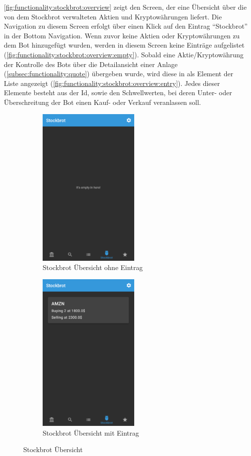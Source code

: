 \documentclass[a4paper]{article}
\begin{document}
\autoref{fig:functionality:stockbrot:overview} zeigt den Screen, der eine Übersicht über die von dem Stockbrot verwalteten Aktien und Kryptowährungen liefert. Die Navigation zu diesem Screen erfolgt über einen Klick auf den Eintrag "`Stockbrot"' in der Bottom Navigation. Wenn zuvor keine Aktien oder Kryptowährungen zu dem Bot hinzugefügt wurden, werden in diesem Screen keine Einträge aufgelistet (\autoref{fig:functionality:stockbrot:overview:empty}). Sobald eine Aktie/Kryptowährung der Kontrolle des Bots über die Detailansicht einer Anlage (\autoref{subsec:functionality:quote}) übergeben wurde, wird diese in als Element der Liste angezeigt (\autoref{fig:functionality:stockbrot:overview:entry}). Jedes dieser Elemente besteht aus der Id, sowie den Schwellwerten, bei deren Unter- oder Überschreitung der Bot einen Kauf- oder Verkauf veranlassen soll.

\begin{figure}[H]
    \begin{subfigure}{.5\textwidth}
        \centering
        \includegraphics[height=8cm,keepaspectratio]{./images/stockbrot_list_empty.png}  
        \caption{Stockbrot Übersicht ohne Eintrag}
        \label{fig:functionality:stockbrot:overview:empty}
    \end{subfigure}
    \begin{subfigure}{.5\textwidth}
        \centering
        \includegraphics[height=8cm,keepaspectratio]{./images/stockbrot_list.png}  
        \caption{Stockbrot Übersicht mit Eintrag}
        \label{fig:functionality:stockbrot:overview:entry}
    \end{subfigure}
    \caption{Stockbrot Übersicht}
    \label{fig:functionality:stockbrot:overview}
\end{figure}
\end{document}
